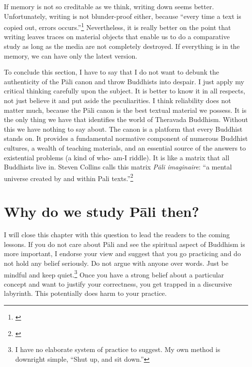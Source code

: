 If memory is not so creditable as we think, writing down seems better. Unfortunately, writing is not blunder-proof either, because ``every time a text is copied out, errors occurs.''\footnote{\citealp[p.~xxvi]{geiger:grammar}} Nevertheless, it is really better on the point that writing leaves traces on material objects that enable us to do a comparative study as long as the media are not completely destroyed. If everything is in the memory, we can have only the latest version.

To conclude this section, I have to say that I do not want to debunk the authenticity of the P\=ali canon and throw Buddhists into despair. I just apply my critical thinking carefully upon the subject. It is better to know it in all respects, not just believe it and put aside the peculiarities. I think reliability does not matter much, because the P\=ali canon is the best textual material we possess. It is the only thing we have that identifies the world of Theravada Buddhism. Without this we have nothing to say about. The canon is a platform that every Buddhist stands on. It provides a fundamental normative component of numerous Buddhist cultures, a wealth of teaching materials, and an essential source of the answers to existential problems (a kind of who- am-I riddle). It is like a matrix that all Buddhists live in. Steven Collins calls this matrix \emph{P\=ali imaginaire}: ``a mental universe created by and within Pali texts.''\footnote{\citealp[p.~41; see also p.~1]{collins:nirvana}}

{}
\section*{Why do we study P\=ali then?}
I will close this chapter with this question to lead the readers to the coming lessons. If you do not care about P\=ali and see the spiritual aspect of Buddhism is more important, I endorse your view and suggest that you go practicing and do not hold any belief seriously. Do not argue with anyone over words. Just be mindful and keep quiet.\footnote{I have no elaborate system of practice to suggest. My own method is downright simple, ``Shut up, and sit down.''} Once you have a strong belief about a particular concept and want to justify your correctness, you get trapped in a discursive labyrinth. This potentially does harm to your practice.

